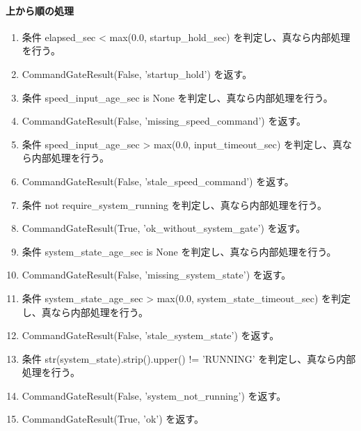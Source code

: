 \documentclass[a4paper,11pt]{article}
\begin{document}
            \paragraph{上から順の処理}
            \begin{enumerate}[leftmargin=1.8em]
            \item 条件 elapsed\_sec < max(0.0, startup\_hold\_sec) を判定し、真なら内部処理を行う。
\item   CommandGateResult(False, 'startup\_hold') を返す。
\item 条件 speed\_input\_age\_sec is None を判定し、真なら内部処理を行う。
\item   CommandGateResult(False, 'missing\_speed\_command') を返す。
\item 条件 speed\_input\_age\_sec > max(0.0, input\_timeout\_sec) を判定し、真なら内部処理を行う。
\item   CommandGateResult(False, 'stale\_speed\_command') を返す。
\item 条件 not require\_system\_running を判定し、真なら内部処理を行う。
\item   CommandGateResult(True, 'ok\_without\_system\_gate') を返す。
\item 条件 system\_state\_age\_sec is None を判定し、真なら内部処理を行う。
\item   CommandGateResult(False, 'missing\_system\_state') を返す。
\item 条件 system\_state\_age\_sec > max(0.0, system\_state\_timeout\_sec) を判定し、真なら内部処理を行う。
\item   CommandGateResult(False, 'stale\_system\_state') を返す。
\item 条件 str(system\_state).strip().upper() != 'RUNNING' を判定し、真なら内部処理を行う。
\item   CommandGateResult(False, 'system\_not\_running') を返す。
\item CommandGateResult(True, 'ok') を返す。
            \end{enumerate}
\end{document}
